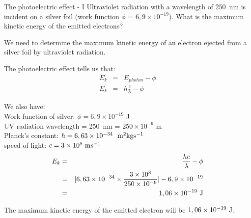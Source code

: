 \begin{wex}{The photoelectric effect - I}
{Ultraviolet radiation with a wavelength of 250~nm is incident on a silver foil (work function $\phi$ = $6,9 \times 10^{-19}$). What is the maximum kinetic energy of the emitted electrons?}
{
We need to determine the maximum kinetic energy of an electron ejected from a silver foil by ultraviolet radiation. 

The photoelectric effect tells us that:
\begin{eqnarray*}
E_{k} & = & E_{photon} - \phi \\
E_k & = & h\frac{c}{\lambda}-\phi
\end{eqnarray*}

We also have: \\
Work function of silver: $\phi =6,9 \times 10^{-19}$ J  \\
UV radiation wavelength = 250~nm = $250 \times 10^{-9}$ m \\
Planck's constant: $h = 6,63 \times 10^{-34}~~\rm{m^{2}}\rm{kg}\rm{s^{-1}}$ \\
speed of light: $c = 3 \times 10^{8}~\rm{m}\rm{s^{-1}}$ \\

\begin{eqnarray*}
E_{k} & = & \frac{hc}{\lambda} - \phi \\
& = & [6,63 \times 10^{-34} \times \frac{3\times10^{8}}{250\times10^{-9}}] - 6,9 \times 10^{-19} \\
& = & 1,06 \times 10^{-19}~\rm{J}
\end{eqnarray*}

The maximum kinetic energy of the emitted electron will be $1,06 \times 10^{-19}~\rm{J}$.}
\end{wex}



